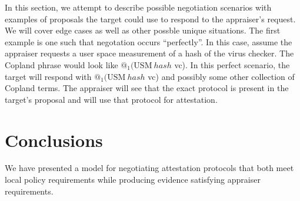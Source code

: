 \documentclass[sigconf,authordraft]{acmart}
\begin{document}
  
In this section, we attempt to describe possible negotiation scenarios
with examples of proposals the target could use to respond to the
appraiser's request. We will cover edge cases as well as other possble
unique situations. The first example is one such that negotation
occurs ``perfectly''. In this case, assume the appraiser requests a user
space measurement of a hash of the virus checker. The Copland phrase
would look like $@_1 (\text{USM}\: hash$ vc). In this perfect
scenario, the target will respond with $@_1 (\text{USM}\: hash$ vc)
and possibly some other collection of Copland terms. The appraiser
will see that the exact protocol is present in the target's proposal
and will use that protocol for attestation.

\section{Conclusions}

We have presented a model for negotiating attestation protocols that
both meet local policy requirements while producing evidence
satisfying appraiser requirements.

\nocite{Coker::Principles-of-R,Ramsdell:2019aa,Petz:2019aa,Davey:02:Introduction-to}

 
\end{document}
